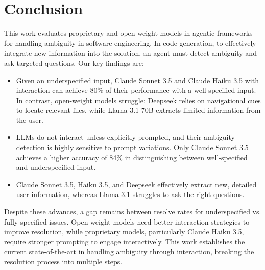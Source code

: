 \section{Conclusion}
\label{sec:Conclusion}
This work evaluates proprietary and open-weight models in agentic frameworks for handling ambiguity in software engineering. In code generation, to effectively integrate new information into the solution, an agent must detect ambiguity and ask targeted questions. Our key findings are:
\begin{itemize}[itemsep=0pt, topsep=0pt]
    \item Given an underspecified input, Claude Sonnet 3.5 and Claude Haiku 3.5 with interaction can achieve 80\% of their performance with a well-specified input. In contrast, open-weight models struggle: Deepseek relies on navigational cues to locate relevant files, while Llama 3.1 70B extracts limited information from the user.
    \item LLMs do not interact unless explicitly prompted, and their ambiguity detection is highly sensitive to prompt variations. Only Claude Sonnet 3.5 achieves a higher accuracy of 84\% in distinguishing between well-specified and underspecified input.

    \item Claude Sonnet 3.5, Haiku 3.5, and Deepseek effectively extract new, detailed user information, whereas Llama 3.1 struggles to ask the right questions.
    
\end{itemize}
Despite these advances, a gap remains between resolve rates for underspecified vs. fully specified issues. Open-weight models need better interaction strategies to improve resolution, while proprietary models, particularly Claude Haiku 3.5, require stronger prompting to engage interactively. This work establishes the current state-of-the-art in handling ambiguity through interaction, breaking the resolution process into multiple steps.


